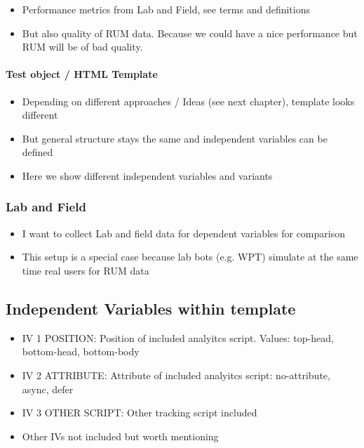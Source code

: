 \begin{itemize}
\item Performance metrics from Lab and Field, see terms and definitions
\item But also quality of RUM data. Because we could have a nice performance but RUM will be of bad quality. 
\end{itemize}


\paragraph{Test object / HTML Template}

\begin{itemize}
\item Depending on different approaches / Ideas (see next chapter), template looks different
\item But general structure stays the same and independent variables can be defined
\item Here we show different independent variables and variants
\end{itemize}


\subsubsection{Lab and Field}

\begin{itemize}
\item I want to collect Lab and field data for dependent variables for comparison
\item This setup is a special case because lab bots (e.g. WPT) simulate at the same time real users for RUM data
\end{itemize}






\subsection{Independent Variables within template}


\begin{itemize}
\item IV 1 POSITION: Position of included analyitcs script. Values: top-head, bottom-head, bottom-body
\item IV 2 ATTRIBUTE: Attribute of included analyitcs script: no-attribute, async, defer
\item IV 3 OTHER SCRIPT: Other tracking script included
\item Other IVs not included but worth mentioning
\end{itemize}




